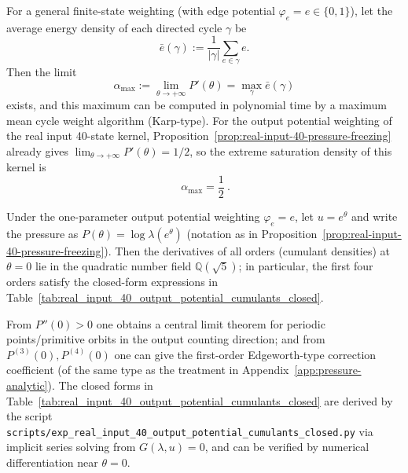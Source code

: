 \begin{corollary}\label{cor:real-input-40-alpha-max}
For a general finite-state weighting (with edge potential \(\varphi_e=e\in\{0,1\}\)), let the average energy density of each directed cycle \(\gamma\) be
\[
\bar e(\gamma):=\frac{1}{|\gamma|}\sum_{e\in\gamma} e.
\]
Then the limit
\[
\alpha_{\max}:=\lim_{\theta\to+\infty}P'(\theta)=\max_{\gamma}\bar e(\gamma)
\]
exists, and this maximum can be computed in polynomial time by a maximum mean cycle weight algorithm (Karp-type).
For the output potential weighting of the real input 40-state kernel, Proposition~\ref{prop:real-input-40-pressure-freezing} already gives
\(\lim_{\theta\to+\infty}P'(\theta)=1/2\), so the extreme saturation density of this kernel is
\[
\boxed{\ \alpha_{\max}=\frac12\ }.
\]
\end{corollary}

\begin{proposition}\label{prop:real-input-40-output-cumulants-closed}
Under the one-parameter output potential weighting \(\varphi_e=e\), let \(u=e^\theta\) and write the pressure as
\(
P(\theta)=\log\lambda(e^\theta)
\)
(notation as in Proposition~\ref{prop:real-input-40-pressure-freezing}).
Then the derivatives of all orders (cumulant densities) at \(\theta=0\) lie in the quadratic number field \(\mathbb Q(\sqrt5)\); in particular, the first four orders satisfy the closed-form expressions in Table~\ref{tab:real_input_40_output_potential_cumulants_closed}.
\end{proposition}
\begin{remark}\label{rem:real-input-40-output-cumulants-clt}
From \(P''(0)>0\) one obtains a central limit theorem for periodic points/primitive orbits in the output counting direction; and from \(P^{(3)}(0),P^{(4)}(0)\) one can give the first-order Edgeworth-type correction coefficient (of the same type as the treatment in Appendix~\ref{app:pressure-analytic}).
The closed forms in Table~\ref{tab:real_input_40_output_potential_cumulants_closed} are derived by the script \texttt{scripts/exp\_real\_input\_40\_output\_potential\_cumulants\_closed.py} via implicit series solving from \(G(\lambda,u)=0\), and can be verified by numerical differentiation near \(\theta=0\).
\end{remark}


